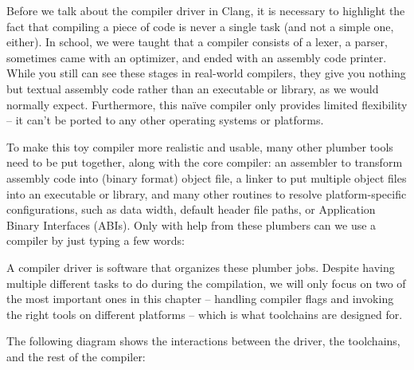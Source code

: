 Before we talk about the compiler driver in Clang, it is necessary to highlight the fact that compiling a piece of code is never a single task (and not a simple one, either). In school, we were taught that a compiler consists of a lexer, a parser, sometimes came with an optimizer, and ended with an assembly code printer. While you still can see these stages in real-world compilers, they give you nothing but textual assembly code rather than an executable or library, as we would normally expect. Furthermore, this naïve compiler only provides limited flexibility – it can't be ported to any other operating systems or platforms.

To make this toy compiler more realistic and usable, many other plumber tools need to be put together, along with the core compiler: an assembler to transform assembly code into (binary format) object file, a linker to put multiple object files into an executable or library, and many other routines to resolve platform-specific configurations, such as data width, default header file paths, or Application Binary Interfaces (ABIs). Only with help from these plumbers can we use a compiler by just typing a few words:


A compiler driver is software that organizes these plumber jobs. Despite having multiple different tasks to do during the compilation, we will only focus on two of the most important ones in this chapter – handling compiler flags and invoking the right tools on different platforms – which is what toolchains are designed for.

The following diagram shows the interactions between the driver, the toolchains, and the rest of the compiler:


